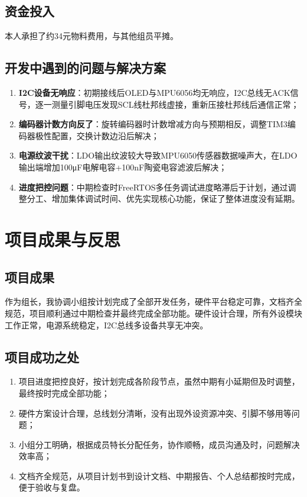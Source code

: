 \documentclass[12pt, a4paper]{ctexart}
\begin{document}
\subsection{资金投入}
本人承担了约34元物料费用，与其他组员平摊。

\subsection{开发中遇到的问题与解决方案}
\begin{enumerate}
    \item \textbf{I2C设备无响应}：初期接线后OLED与MPU6056均无响应，I2C总线无ACK信号，逐一测量引脚电压发现SCL线杜邦线虚接，重新压接杜邦线后通信正常；
    \item \textbf{编码器计数方向反了}：旋转编码器时计数增减方向与预期相反，调整TIM3编码器极性配置，交换计数边沿后解决；
    \item \textbf{电源纹波干扰}：LDO输出纹波较大导致MPU6050传感器数据噪声大，在LDO输出端增加100μF电解电容+100nF陶瓷电容滤波后解决；
    \item \textbf{进度把控问题}：中期检查时FreeRTOS多任务调试进度略滞后于计划，通过调整分工、增加集体调试时间、优先实现核心功能，保证了整体进度没有延期。
\end{enumerate}

\section{项目成果与反思}
\subsection{项目成果}
作为组长，我协调小组按计划完成了全部开发任务，硬件平台稳定可靠，文档齐全规范，项目顺利通过中期检查并最终完成全部功能。硬件设计合理，所有外设模块工作正常，电源系统稳定，I2C总线多设备共享无冲突。

\subsection{项目成功之处}
\begin{enumerate}
    \item 项目进度把控良好，按计划完成各阶段节点，虽然中期有小延期但及时调整，最终按时完成全部功能；
    \item 硬件方案设计合理，总线划分清晰，没有出现外设资源冲突、引脚不够用等问题；
    \item 小组分工明确，根据成员特长分配任务，协作顺畅，成员沟通及时，问题解决效率高；
    \item 文档齐全规范，从项目计划书到设计文档、中期报告、个人总结都按时完成，便于验收与复盘。
\end{enumerate}
\end{document}
